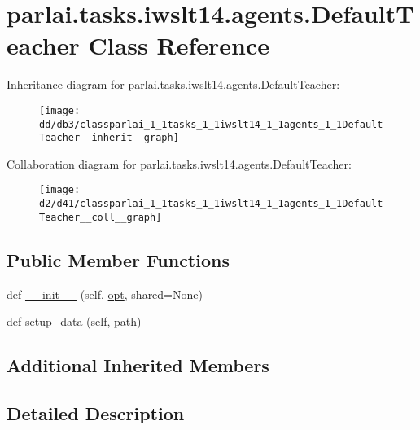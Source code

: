 \hypertarget{classparlai_1_1tasks_1_1iwslt14_1_1agents_1_1DefaultTeacher}{}\section{parlai.\+tasks.\+iwslt14.\+agents.\+Default\+Teacher Class Reference}
\label{classparlai_1_1tasks_1_1iwslt14_1_1agents_1_1DefaultTeacher}


Inheritance diagram for parlai.\+tasks.\+iwslt14.\+agents.\+Default\+Teacher\+:\nopagebreak
\begin{figure}[H]
\begin{center}
\leavevmode
\texttt{[image: dd/db3/classparlai\_1\_1tasks\_1\_1iwslt14\_1\_1agents\_1\_1DefaultTeacher\_\_inherit\_\_graph]}
\end{center}
\end{figure}


Collaboration diagram for parlai.\+tasks.\+iwslt14.\+agents.\+Default\+Teacher\+:\nopagebreak
\begin{figure}[H]
\begin{center}
\leavevmode
\texttt{[image: d2/d41/classparlai\_1\_1tasks\_1\_1iwslt14\_1\_1agents\_1\_1DefaultTeacher\_\_coll\_\_graph]}
\end{center}
\end{figure}
\subsection*{Public Member Functions}
\begin{DoxyCompactItemize}
\item 
def \hyperlink{classparlai_1_1tasks_1_1iwslt14_1_1agents_1_1DefaultTeacher_a7a9bec3db40cf2d087952493dbbae0a0}{\+\_\+\+\_\+init\+\_\+\+\_\+} (self, \hyperlink{classparlai_1_1core_1_1agents_1_1Teacher_a3ce6243860ce978a897922863ed32fa4}{opt}, shared=None)
\item 
def \hyperlink{classparlai_1_1tasks_1_1iwslt14_1_1agents_1_1DefaultTeacher_a3294d31a37e9260469383275154df900}{setup\+\_\+data} (self, path)
\end{DoxyCompactItemize}
\subsection*{Additional Inherited Members}


\subsection{Detailed Description}



